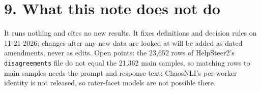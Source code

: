 \documentclass[10.5pt]{article}
\begin{document}
\section*{9. What this note does not do}
It runs nothing and cites no new results. It fixes definitions and decision rules on 11-21-2026; changes after any new data are looked at will be added as dated amendments, never as edits. Open points: the 23,652 rows of HelpSteer2's \texttt{disagreements} file do not equal the 21,362 main samples, so matching rows to main samples needs the prompt and response text; ChaosNLI's per-worker identity is not released, so rater-facet models are not possible there.
\end{document}
